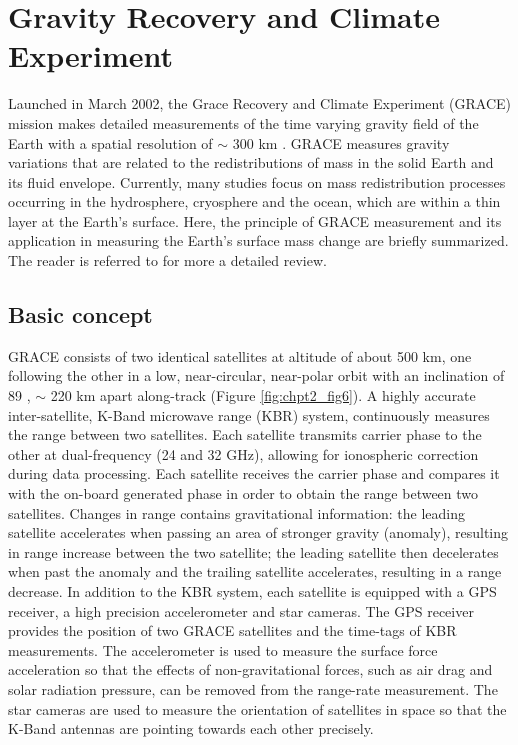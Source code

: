 \section{Gravity Recovery and Climate Experiment}
Launched in March 2002, the Grace Recovery and Climate Experiment (GRACE) mission makes detailed measurements of the time varying gravity field of the Earth with a spatial resolution of $\sim$ 300 km \cite[]{tapley2004chpt2,wahr2004chpt2}.    GRACE measures gravity variations that are related to the redistributions of mass in the solid Earth and its fluid envelope.  Currently, many studies focus on mass redistribution processes occurring in the hydrosphere, cryosphere and the ocean, which are within a thin layer at the Earth’s surface.  Here, the principle of GRACE measurement and its application in measuring the Earth’s surface mass change are briefly summarized.  The reader is referred to \citet{wouters2014chpt2} for more a detailed review. 

\subsection{Basic concept}
GRACE consists of two identical satellites at altitude of about 500 km, one following the other in a low, near-circular, near-polar orbit with an inclination of 89 \textordmasculine, $\sim$ 220 km apart along-track (Figure \ref{fig:chpt2_fig6}).  A highly accurate inter-satellite, K-Band microwave range (KBR) system, continuously measures the range between two satellites.  Each satellite transmits carrier phase to the other at dual-frequency (24 and 32 GHz), allowing for ionospheric correction during data processing.  Each satellite receives the carrier phase and compares it with the on-board generated phase in order to obtain the range between two satellites.  Changes in range contains gravitational information: the leading satellite accelerates when passing an area of stronger gravity (anomaly), resulting in range increase between the two satellite; the leading satellite then decelerates when past the anomaly and the trailing satellite accelerates, resulting in a range decrease.  In addition to the KBR system, each satellite is equipped with a GPS receiver, a high precision accelerometer and star cameras.  The GPS receiver provides the position of two GRACE satellites and the time-tags of KBR measurements.  The accelerometer is used to measure the surface force acceleration so that the effects of non-gravitational forces, such as air drag and solar radiation pressure, can be removed from the range-rate measurement.  The star cameras are used to measure the orientation of satellites in space so that the K-Band antennas are pointing towards each other precisely.  

